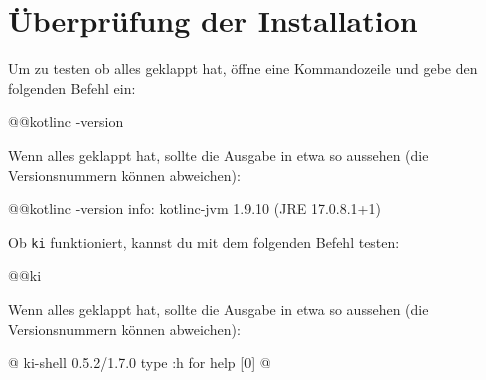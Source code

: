\section*{Überprüfung der Installation}\label{sec:check}
Um zu testen ob alles geklappt hat, öffne eine Kommandozeile und gebe den folgenden Befehl ein:
\begin{commandshell}
    @\shellprefix{}@kotlinc -version
\end{commandshell}

Wenn alles geklappt hat, sollte die Ausgabe in etwa so aussehen (die Versionsnummern können abweichen):
\begin{commandshell}[][]
    @\shellprefix{}@kotlinc -version
    info: kotlinc-jvm 1.9.10 (JRE 17.0.8.1+1)
\end{commandshell}

Ob \texttt{ki} funktioniert, kannst du mit dem folgenden Befehl testen:
\begin{commandshell}
    @\shellprefix{}@ki
\end{commandshell}
Wenn alles geklappt hat, sollte die Ausgabe in etwa so aussehen (die Versionsnummern können abweichen):
\begin{commandshell}[][minted language=text]
    @\shellprefix@ki
    ki-shell 0.5.2/1.7.0
    type :h for help
    [0] @\shellcursor@
\end{commandshell}


